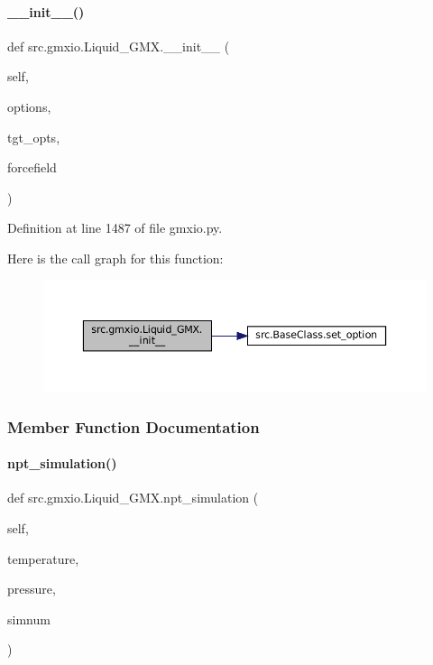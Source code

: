 \paragraph{\texorpdfstring{\+\_\+\+\_\+init\+\_\+\+\_\+()}{\_\_init\_\_()}}
{\footnotesize\ttfamily def src.\+gmxio.\+Liquid\+\_\+\+G\+M\+X.\+\_\+\+\_\+init\+\_\+\+\_\+ (\begin{DoxyParamCaption}\item[{}]{self,  }\item[{}]{options,  }\item[{}]{tgt\+\_\+opts,  }\item[{}]{forcefield }\end{DoxyParamCaption})}



Definition at line 1487 of file gmxio.\+py.

Here is the call graph for this function\+:
\nopagebreak
\begin{figure}[H]
\begin{center}
\leavevmode
\includegraphics[width=350pt]{classsrc_1_1gmxio_1_1Liquid__GMX_a4084ac631cf4924a9ff202a5ee6c501e_cgraph}
\end{center}
\end{figure}


\subsubsection{Member Function Documentation}
\mbox{\label{classsrc_1_1gmxio_1_1Liquid__GMX_a6ddb76474e47e2bb1ba6ed2b58f1b29e}} 
\paragraph{\texorpdfstring{npt\+\_\+simulation()}{npt\_simulation()}}
{\footnotesize\ttfamily def src.\+gmxio.\+Liquid\+\_\+\+G\+M\+X.\+npt\+\_\+simulation (\begin{DoxyParamCaption}\item[{}]{self,  }\item[{}]{temperature,  }\item[{}]{pressure,  }\item[{}]{simnum }\end{DoxyParamCaption})}



